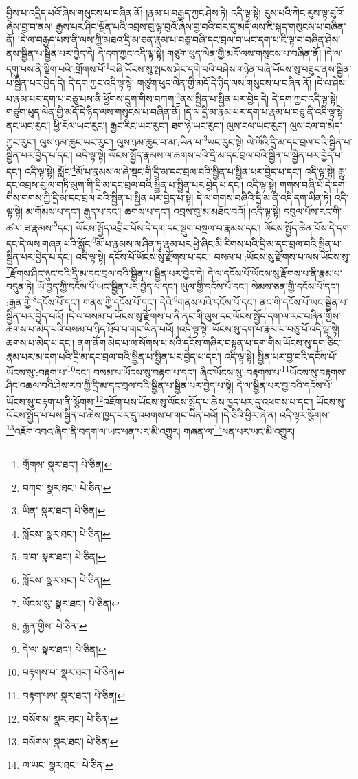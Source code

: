 བྱིས་པ་འདྲིད་པའོ་ཞེས་གསུངས་པ་བཞིན་ནོ། །རྣམ་པ་བརྒྱད་ཀྱང་ཤེས་ཏེ། འདི་ལྟ་སྟེ། རུས་པའི་ཀེང་རུས་ལྟ་བུའོ་ཞེས་བྱ་བ་ནས། རྒྱས་པར་ཤིང་ལྗོན་པའི་འབྲས་བུ་ལྟ་བུའོ་ཞེས་བྱ་བའི་བར་དུ་མདོ་ལས་ཇི་སྐད་གསུངས་པ་བཞིན་ནོ། །དེ་ལ་བརྒྱད་པས་ནི་ལས་ཀྱི་མཐའ་དྲི་མ་ཅན་རྣམ་པ་བཅུ་བཞི་དང་བྲལ་བ་ཡང་དག་པ་ཇི་ལྟ་བ་བཞིན་ཤེས་ནས་སྦྱིན་པ་སྦྱིན་པར་བྱེད་དེ། དེ་དག་ཀྱང་འདི་ལྟ་སྟེ། གཙུག་ཕུད་ལེན་གྱི་མདོ་ལས་གསུངས་པ་བཞིན་ནོ། །དེ་ལ་དགུ་པས་ནི་སྡིག་པའི་:གྲོགས་པོ་\footnote{གྲོགས་  སྣར་ཐང་།  པེ་ཅིན། }བཞི་ཡོངས་སུ་སྤངས་ཤིང་དགེ་བའི་བཤེས་གཉེན་བཞི་ཡོངས་སུ་བཟུང་ནས་སྦྱིན་པ་སྦྱིན་པར་བྱེད་དེ། དེ་དག་ཀྱང་འདི་ལྟ་སྟེ། གཙུག་ཕུད་ལེན་གྱི་མདོ་དེ་ཉིད་ལས་གསུངས་པ་བཞིན་ནོ། །དེ་ལ་ཤེས་པ་རྣམ་པར་དག་པ་བཅུ་པས་ནི་ཕྱོགས་དྲུག་གིས་བཀག་\footnote{བཀབ་  སྣར་ཐང་།  པེ་ཅིན། }ནས་སྦྱིན་པ་སྦྱིན་པར་བྱེད་དེ། དེ་དག་ཀྱང་འདི་ལྟ་སྟེ། གཙུག་ཕུད་ལེན་གྱི་མདོ་དེ་ཉིད་ལས་གསུངས་པ་བཞིན་ནོ། །དེ་ལ་དྲི་མ་རྣམ་པར་དག་པ་རྣམ་པ་བཅུ་ནི་འདི་ལྟ་སྟེ། ནང་ཡང་རུང་། ཕྱི་རོལ་ཡང་རུང་། རྒྱང་རིང་ཡང་རུང་། ཐག་ཉེ་ཡང་རུང་། ལུས་ངལ་ཡང་རུང་། ལུས་ངལ་བ་མེད་ཀྱང་རུང་། ལུས་ཉམ་ཆུང་ཡང་རུང་། ལུས་ཉམ་ཆུང་བ་མ་:ཡིན་པ་\footnote{ཡིན་  སྣར་ཐང་།  པེ་ཅིན། }ཡང་རུང་སྟེ། ལེ་ལོའི་དྲི་མ་དང་བྲལ་བའི་སྦྱིན་པ་སྦྱིན་པར་བྱེད་པ་དང་། འདི་ལྟ་སྟེ། ལོངས་སྤྱོད་རྣམས་ལ་ཆགས་པའི་དྲི་མ་དང་བྲལ་བའི་སྦྱིན་པ་སྦྱིན་པར་བྱེད་པ་དང་། འདི་ལྟ་སྟེ། སློང་\footnote{སློངས་  སྣར་ཐང་།  པེ་ཅིན། }མོ་པ་རྣམས་ལ་ཞེ་སྡང་གི་དྲི་མ་དང་བྲལ་བའི་སྦྱིན་པ་སྦྱིན་པར་བྱེད་པ་དང་། འདི་ལྟ་སྟེ། རྒྱུ་དང་འབྲས་བུ་ལ་གཏི་མུག་གི་དྲི་མ་དང་བྲལ་བའི་སྦྱིན་པ་སྦྱིན་པར་བྱེད་པ་དང་། འདི་ལྟ་སྟེ། གགས་བཞི་པོ་དེ་དག་གིས་གགས་ཀྱི་དྲི་མ་དང་བྲལ་བའི་སྦྱིན་པ་སྦྱིན་པར་བྱེད་པ་སྟེ། དེ་ལ་གགས་བཞིའི་དྲི་མ་ནི་འདི་དག་ཡིན་ཏེ། འདི་ལྟ་སྟེ། མ་གོམས་པ་དང་། རྒུད་པ་དང་། ཆགས་པ་དང་། འབྲས་བུ་མ་མཐོང་བའོ། །འདི་ལྟ་སྟེ། དབུལ་པོས་རང་གི་ཚལ་:ཟ་རྣམས་\footnote{ཟ་བ་  སྣར་ཐང་།  པེ་ཅིན། }དང་། ལོངས་སྤྱོད་འབྲིང་པོས་དེ་དག་དང་སྡུག་བསྔལ་བ་རྣམས་དང་། ལོངས་སྤྱོད་ཆེན་པོས་དེ་དག་དང་དེ་ལས་གཞན་པའི་སློང་\footnote{སློངས་  སྣར་ཐང་།  པེ་ཅིན། }མོ་པ་རྣམས་ལ་ཤིན་ཏུ་རྣམ་པར་ཕྱེ་ཞིང་མི་རིགས་པའི་དྲི་མ་དང་བྲལ་བའི་སྦྱིན་པ་སྦྱིན་པར་བྱེད་པ་དང་། འདི་ལྟ་སྟེ། དངོས་པོ་ཡོངས་སུ་རྫོགས་པ་དང་། བསམ་པ་:ཡོངས་སུ་རྫོགས་པ་ལས་ཡོངས་སུ་\footnote{ཡོངས་སུ་  སྣར་ཐང་།  པེ་ཅིན། }རྫོགས་ཤིང་ཉུང་བའི་དྲི་མ་དང་བྲལ་བའི་སྦྱིན་པ་སྦྱིན་པར་བྱེད་དེ། དེ་ལ་དངོས་པོ་ཡོངས་སུ་རྫོགས་པ་ནི་རྣམ་པ་བདུན་ཏེ། ཡོ་བྱད་ཀྱི་དངོས་པོ་ཡང་སྦྱིན་པར་བྱེད་པ་དང་། ཡུལ་གྱི་དངོས་པོ་དང་། སེམས་ཅན་གྱི་དངོས་པོ་དང་། :རྒྱན་གྱི་\footnote{རྒྱན་གྱིས་  པེ་ཅིན། }དངོས་པོ་དང་། གནས་ཀྱི་དངོས་པོ་དང་། དེའི་\footnote{དེ་ལ་  སྣར་ཐང་།  པེ་ཅིན། }གནས་པའི་དངོས་པོ་དང་། ནང་གི་དངོས་པོ་ཡང་སྦྱིན་པ་སྦྱིན་པར་བྱེད་པའོ། །དེ་ལ་བསམ་པ་ཡོངས་སུ་རྫོགས་པ་ནི་ནང་གི་ལུས་དང་ལོངས་སྤྱོད་དག་ལ་རང་བཞིན་གྱིས་ཆགས་པ་མེད་པའི་བསམ་པ་ཉིད་ཐོབ་པ་གང་ཡིན་པའོ། །འདི་ལྟ་སྟེ། ཡོངས་སུ་དག་པ་རྣམ་པ་བཅུ་པོ་འདི་ལྟ་སྟེ། ཆགས་པ་མེད་པ་དང་། ནག་ནོག་མེད་པ་ལ་སོགས་པ་སའི་དངོས་གཞིར་བསྟན་པ་དག་གིས་ཡོངས་སུ་དག་ཅིང་། རྣམ་པར་མ་དག་པའི་དྲི་མ་དང་བྲལ་བའི་སྦྱིན་པ་སྦྱིན་པར་བྱེད་པ་དང་། འདི་ལྟ་སྟེ། སྦྱིན་པར་བྱ་བའི་དངོས་པོ་ཡོངས་སུ་:བརྟག་པ་\footnote{བརྟགས་པ་  སྣར་ཐང་།  པེ་ཅིན། }དང་། བསམ་པ་ཡོངས་སུ་བརྟག་པ་དང་། ཞིང་ཡོངས་སུ་:བརྟགས་པ་\footnote{བརྟག་པས་  སྣར་ཐང་།  པེ་ཅིན། }ཡོངས་སུ་བརྟགས་ཤིང་འཆལ་བའི་ཤེས་རབ་ཀྱི་དྲི་མ་དང་བྲལ་བའི་སྦྱིན་པ་སྦྱིན་པར་བྱེད་པ་སྟེ། དེ་ལ་སྦྱིན་པར་བྱ་བའི་དངོས་པོ་ཡོངས་སུ་བརྟག་པ་ནི་སྩོགས་\footnote{བསོགས་  སྣར་ཐང་།  པེ་ཅིན། }འཇོག་པས་ཡོངས་སུ་ལོངས་སྤྱོད་པ་ཆེས་ཁྱད་པར་དུ་འཕགས་པ་དང་། ཡོངས་སུ་ལོངས་སྤྱོད་པ་པས་སྦྱིན་པ་ཆེས་ཁྱད་པར་དུ་འཕགས་པ་གང་ཡིན་པའོ། །དེ་ཅིའི་ཕྱིར་ཞེ་ན། འདི་ལྟར་སྩོགས་\footnote{བསོགས་  སྣར་ཐང་།  པེ་ཅིན། }འཇོག་འབའ་ཞིག་ནི་བདག་ལ་ཡང་ཕན་པར་མི་འགྱུར། གཞན་ལ་\footnote{ལ་ཡང་  སྣར་ཐང་།  པེ་ཅིན། }ཕན་པར་ཡང་མི་འགྱུར། 